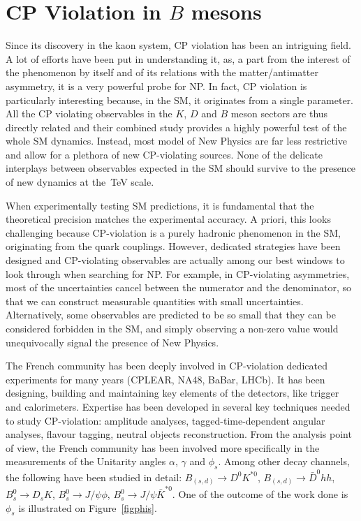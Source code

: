 

\section{CP Violation in  $B$ mesons}
\label{sec:cpv}
Since its discovery in the kaon system, CP violation has been an intriguing field. A lot of efforts have been put in understanding it, as,  a part from the interest of the phenomenon by itself and of its relations with the matter/antimatter asymmetry, it is a very powerful probe for NP.  In fact,  CP violation is particularly interesting because, in the SM, it originates from a single parameter. All the CP violating observables in the $K$, $D$ and $B$ meson sectors are thus directly related and
their combined study provides a highly powerful test of the whole SM dynamics.
Instead, most model of New Physics are far less restrictive and allow for a
plethora of new CP-violating sources. None of the delicate interplays between
observables expected in the SM should survive to the presence of new dynamics
at the~TeV scale.


When experimentally testing SM predictions, it is fundamental that the
theoretical precision matches the experimental accuracy. A priori, this looks
challenging because CP-violation is a purely hadronic phenomenon in the SM,
originating from the quark couplings. However, dedicated strategies have been
designed and CP-violating observables are actually among our best windows to look through when searching for  NP. For
example, in CP-violating asymmetries, most of the uncertainties cancel between
the numerator and the denominator, so that we can construct measurable
quantities with small uncertainties. Alternatively, some observables are
predicted to be so small that they can be considered forbidden in the SM, and
simply observing a non-zero value would unequivocally signal the presence of
New Physics.

The French community has been deeply involved in CP-violation dedicated experiments for
many years (CPLEAR, NA48, BaBar, LHCb). It has been designing, building and maintaining key
elements of the detectors, like trigger and calorimeters. Expertise has been developed in
several key techniques needed to study CP-violation: amplitude analyses, tagged-time-dependent
angular analyses, flavour tagging, neutral objects reconstruction. From the analysis point of view,   the
French community has been involved more specifically in the measurements of the Unitarity angles
$\alpha$, $\gamma$ and $\phi_{s}$. Among other decay channels, the following
have been
studied in detail:
$B_{(s,d)}\to D^{0} K^{*0}$, $B_{(s,d)}\to\bar{D}^{0} hh$, $B^{0}_{s} \to
D_{s} K$, $B^{0}_{s} \to J/\psi\phi$,
$B^{0}_{s} \to J/\psi\bar{K}^{*0}$. 
One of the outcome of the work done is
$\phi_{s}$ is illustrated on Figure~\ref{figphis}.  

